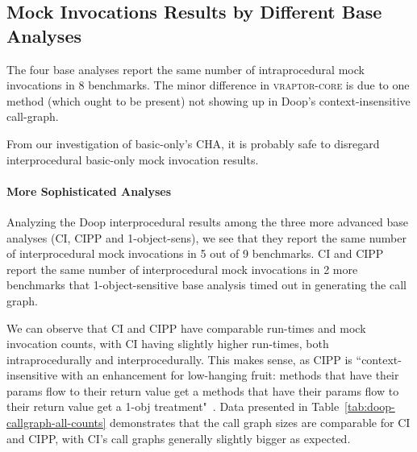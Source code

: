 \subsection{Mock Invocations Results by Different Base Analyses}

The four base analyses report the same number of intraprocedural mock invocations in 8 benchmarks. The minor difference in \textsc{vraptor-core} is due to one method (which ought to be present) not showing up in Doop's context-insensitive call-graph. 

From our investigation of basic-only's CHA, it is probably safe to disregard interprocedural basic-only mock invocation results.


\paragraph{More Sophisticated Analyses}
Analyzing the Doop interprocedural results among the three more advanced base analyses (CI, CIPP and 1-object-sens), we see that they report the same number of interprocedural mock invocations in 5 out of 9 benchmarks. CI and CIPP report the same number of interprocedural mock invocations in 2 more benchmarks that 1-object-sensitive base analysis timed out in generating the call graph.


We can observe that CI and CIPP have comparable run-times and mock invocation counts, with CI having slightly higher run-times, both intraprocedurally and interprocedurally. This makes sense, as CIPP is ``context-insensitive with an enhancement for low-hanging fruit: methods that have their params flow to their return value get a methods that have their params flow to their return value get a 1-obj treatment"~\cite{yanniss}. Data presented in Table~\ref{tab:doop-callgraph-all-counts} demonstrates that the call graph sizes are comparable for CI and CIPP, with CI's call graphs generally slightly bigger as expected. 

